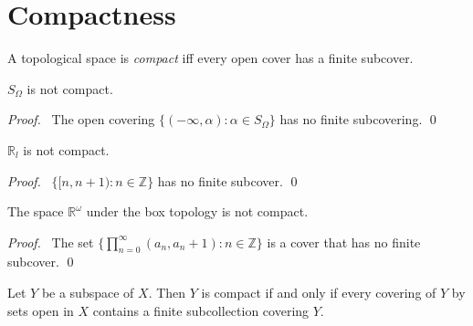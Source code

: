 \section{Compactness}

\begin{df}[Compact]
  A topological space is \emph{compact} iff every open cover has a finite
  subcover.
\end{df}

 \begin{prop}
   \label{prop:topology:compact:S_omega}
$S_\Omega$ is not compact.
\end{prop}

\begin{proof}
 \pf\ The open covering $\{ (- \infty, \alpha) : \alpha \in S_\Omega \}$ has
 no finite subcovering. \qed
\end{proof}

\begin{prop}
 $\mathbb{R}_l$ is not compact.
\end{prop}

\begin{proof}
 \pf\ $\{ [n, n+1) : n \in \mathbb{Z} \}$ has no finite subcover. \qed
\end{proof}

\begin{prop}
 The space $\mathbb{R}^\omega$ under the box topology is not compact.
\end{prop}

\begin{proof}
 \pf\ The set $\{ \prod_{n=0}^\infty (a_n, a_n+1) : n \in \mathbb{Z}
\}$ is a cover that has no finite subcover. \qed
\end{proof}

\begin{prop}
  \label{prop:topology:compact:subspace}
  Let $Y$ be a subspace of $X$. Then $Y$ is compact if and only if every
  covering of $Y$ by sets open in $X$ contains a finite subcollection
  covering
  $Y$.
\end{prop}

